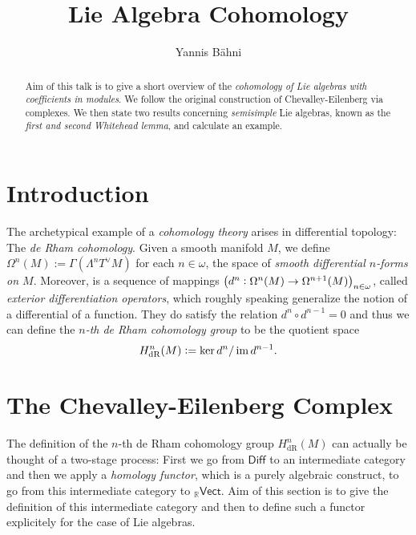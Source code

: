 

\setcounter{section}{1}

\title{Lie Algebra Cohomology}
\author{Yannis B\"{a}hni}
\address[Yannis B\"{a}hni]{University of Zurich, R\"{a}mistrasse 71, 8006 Zurich}



\begin{abstract}
	Aim of this talk is to give a short overview of the \emph{cohomology of Lie algebras with coefficients in modules}. We follow the original construction of Chevalley-Eilenberg via complexes. We then state two results concerning \emph{semisimple} Lie algebras, known as the \emph{first and second Whitehead lemma}, and calculate an example. 
\end{abstract}

\maketitle

\tableofcontents

\section*{Introduction}
The archetypical example of a \emph{cohomology theory} arises in differential topology: The \emph{de Rham cohomology}. Given a smooth manifold $M$, we define $\Omega^n(M) := \Gamma(\Lambda^n T^\vee M)$ for each $n \in \omega$, the space of \emph{smooth differential $n$-forms on $M$}. Moreover, is a sequence of mappings $\del[1]{d^n : \Omega^n(M) \to \Omega^{n + 1}(M)}_{n \in \omega}$, called \emph{exterior differentiation operators}, which roughly speaking generalize the notion of a differential of a function. They do satisfy the relation $d^n \circ d^{n - 1} = 0$ and thus we can define the \emph{$n$-th de Rham cohomology group} to be the quotient space
\begin{equation*}
	H^n_{\mathrm{dR}}(M) := \ker d^n/\operatorname{im} d^{n - 1}.
\end{equation*}

\section*{The Chevalley-Eilenberg Complex}
The definition of the $n$-th de Rham cohomology group $H^n_{\mathrm{dR}}(M)$ can actually be thought of a two-stage process: First we go from $\mathsf{Diff}$ to an intermediate category and then we apply a \emph{homology functor}, which is a purely algebraic construct, to go from this intermediate category to $_{\mathbb{R}}\mathsf{Vect}$. Aim of this section is to give the definition of this intermediate category and then to define such a functor explicitely for the case of Lie algebras.

